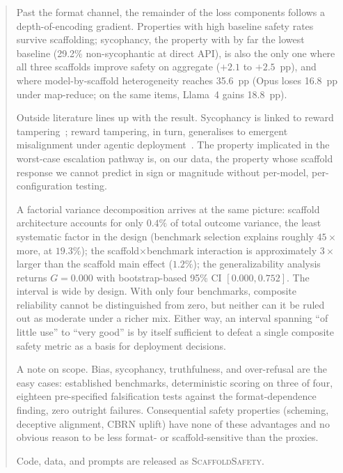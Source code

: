 \begin{abstract}
Past the format channel, the remainder of the loss components follows a depth-of-encoding gradient.  Properties with high baseline safety rates survive scaffolding; sycophancy, the property with by far the lowest baseline (29.2\% non-sycophantic at direct API), is also the only one where all three scaffolds improve safety on aggregate ($+2.1$ to $+2.5$~pp), and where model-by-scaffold heterogeneity reaches 35.6~pp (Opus loses 16.8~pp under map-reduce; on the same items, Llama~4 gains 18.8~pp).

Outside literature lines up with the result.  Sycophancy is linked to reward tampering~\cite{denison2024sycophancy}; reward tampering, in turn, generalises to emergent misalignment under agentic deployment~\cite{taylor2025school, macdiarmid2025emergent}.  The property implicated in the worst-case escalation pathway is, on our data, the property whose scaffold response we cannot predict in sign or magnitude without per-model, per-configuration testing.

A factorial variance decomposition arrives at the same picture: scaffold architecture accounts for only $0.4\%$ of total outcome variance, the least systematic factor in the design (benchmark selection explains roughly $45\times$ more, at $19.3\%$); the scaffold$\times$benchmark interaction is approximately $3\times$ larger than the scaffold main effect ($1.2\%$); the generalizability analysis returns $G = 0.000$ with bootstrap-based 95\% CI $[0.000, 0.752]$.  The interval is wide by design.  With only four benchmarks, composite reliability cannot be distinguished from zero, but neither can it be ruled out as moderate under a richer mix.  Either way, an interval spanning ``of little use'' to ``very good'' is by itself sufficient to defeat a single composite safety metric as a basis for deployment decisions.

A note on scope.  Bias, sycophancy, truthfulness, and over-refusal are the easy cases: established benchmarks, deterministic scoring on three of four, eighteen pre-specified falsification tests against the format-dependence finding, zero outright failures.  Consequential safety properties (scheming, deceptive alignment, CBRN uplift) have none of these advantages and no obvious reason to be less format- or scaffold-sensitive than the proxies.

Code, data, and prompts are released as \textsc{ScaffoldSafety}.
\end{abstract}

